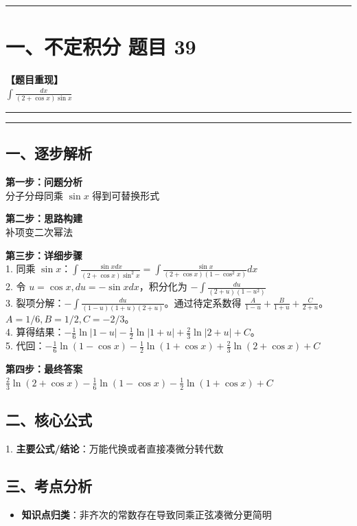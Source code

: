 ﻿\documentclass[12pt, a4paper]{ctexart}
\newcommand{\TopSeparator}{
    \par\noindent\rule{\textwidth}{1.5pt}\vspace{0.5em}
}
\newcommand{\AnalysisSeparator}{
    \par\noindent\rule{\textwidth}{0.5pt}\vspace{0.2em}\hrule\vspace{0.5em}
}
\newenvironment{RedAnalysis}{
    \par
    \color{red} 
}{
    \par
    \color{black} 
}
\begin{document}
\vspace{2em}

\TopSeparator
\section*{一、不定积分 题目 39}

\textbf{【题目重现】} \\
$\int \frac{dx}{(2+\cos x)\sin x}$

\AnalysisSeparator

\begin{RedAnalysis}

	\subsection*{一、逐步解析}

	\textbf{第一步：问题分析} \\
	分子分母同乘 $\sin x$ 得到可替换形式

	\textbf{第二步：思路构建} \\
	补项变二次幂法

	\textbf{第三步：详细步骤} \\
	1. 同乘 $\sin x$：$\int \frac{\sin x dx}{(2+\cos x)\sin^2 x} = \int \frac{\sin x}{(2+\cos x)(1-\cos^2 x)} dx$ \\ 
	2. 令 $u = \cos x, du = -\sin x dx$，积分化为 $-\int \frac{du}{(2+u)(1-u^2)}$ \\ 
	3. 裂项分解：$-\int \frac{du}{(1-u)(1+u)(2+u)}$。通过待定系数得 $\frac{A}{1-u} + \frac{B}{1+u} + \frac{C}{2+u}$。 \\ 
	$A=1/6, B=1/2, C=-2/3$。 \\ 
	4. 算得结果：$-\frac{1}{6}\ln|1-u| - \frac{1}{2}\ln|1+u| + \frac{2}{3}\ln|2+u| + C$。 \\ 
	5. 代回：$-\frac{1}{6}\ln(1-\cos x) - \frac{1}{2}\ln(1+\cos x) + \frac{2}{3}\ln(2+\cos x) + C$

	\textbf{第四步：最终答案} \\
	$\frac{2}{3}\ln(2+\cos x) - \frac{1}{6}\ln(1-\cos x) - \frac{1}{2}\ln(1+\cos x) + C$

	\subsection*{二、核心公式}
	1. \textbf{主要公式/结论}：$\text{万能代换或者直接凑微分转代数}$

	\subsection*{三、考点分析}
	\begin{itemize}
		\item \textbf{知识点归类}：非齐次的常数存在导致同乘正弦凑微分更简明
	\end{itemize}

\end{RedAnalysis}
\end{document}
